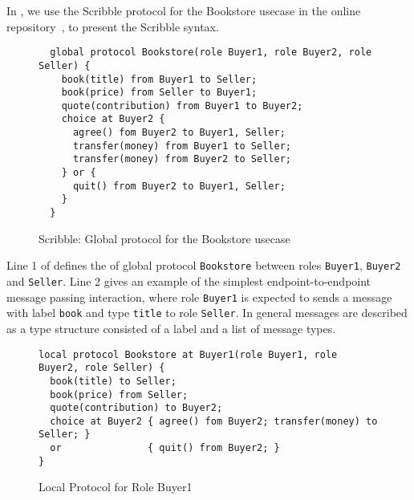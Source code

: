 In , we use the Scribble protocol for the
Bookstore usecase in the online repository~\cite{usecase_repository},
to present the Scribble syntax.

\begin{figure}[t]
\begin{lstlisting}
  global protocol Bookstore(role Buyer1, role Buyer2, role Seller) {
    book(title) from Buyer1 to Seller;
    book(price) from Seller to Buyer1;
    quote(contribution) from Buyer1 to Buyer2;
    choice at Buyer2 {
      agree() fom Buyer2 to Buyer1, Seller;
      transfer(money) from Buyer1 to Seller;
      transfer(money) from Buyer2 to Seller;
    } or {
      quit() from Buyer2 to Buyer1, Seller;
    }
  }
\end{lstlisting}
\caption{Scribble: Global protocol for the Bookstore usecase}
\label{fig:scribble_bs}
\end{figure}


Line 1 of  defines the 
of global protocol \lstinline|Bookstore| between
roles \lstinline|Buyer1|, \lstinline|Buyer2| and \lstinline|Seller|.
Line 2 gives an example of the simplest endpoint-to-endpoint
message passing interaction,
where role \lstinline|Buyer1| is expected to sends a message with
label \lstinline|book| and type \lstinline|title| to role
\lstinline{Seller}.
In general messages are described as a type structure
consisted of a label and a list of message types.



\begin{figure}[t]
\begin{lstlisting}
local protocol Bookstore at Buyer1(role Buyer1, role Buyer2, role Seller) {
  book(title) to Seller;
  book(price) from Seller;
  quote(contribution) to Buyer2;
  choice at Buyer2 { agree() fom Buyer2; transfer(money) to Seller; }
  or               { quit() from Buyer2; }
}
\end{lstlisting}
	\caption{Local Protocol for Role Buyer1}
\end{figure}


